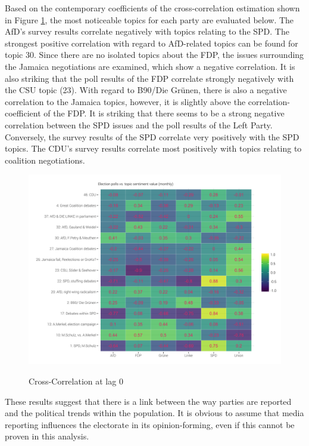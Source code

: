 \documentclass[12pt,a4paper,notitlepage]{article}
\begin{document}
Based on the contemporary coefficients of the cross-correlation estimation shown in Figure \ref{fig_ccf}, the most noticeable topics for each party are evaluated below. The AfD's survey results correlate negatively with topics relating to the SPD. The strongest positive correlation with regard to AfD-related topics can be found for topic 30. Since there are no isolated topics about the FDP, the issues surrounding the Jamaica negotiations are examined, which show a negative correlation. It is also striking that the poll results of the FDP correlate strongly negatively with the CSU topic (23). With regard to B90/Die Grünen, there is also a negative correlation to the Jamaica topics, however, it is slightly above the correlation-coefficient of the FDP. It is striking that there seems to be a strong negative correlation between the SPD issues and the poll results of the Left Party. Conversely, the survey results of the SPD correlate very positively with the SPD topics. The CDU's survey results correlate most positively with topics relating to coalition negotiations.

\begin{figure}[H]
	\caption{Cross-Correlation at lag 0}
	\begin{center}
			\includegraphics[width=\textwidth,keepaspectratio]{../figs/ccf.png}
			\label{fig_ccf}
	\end{center}
\end{figure}

These results suggest that there is a link between the way parties are reported and the political trends within the population. It is obvious to assume that media reporting influences the electorate in its opinion-forming, even if this cannot be proven in this analysis. 
\end{document}
